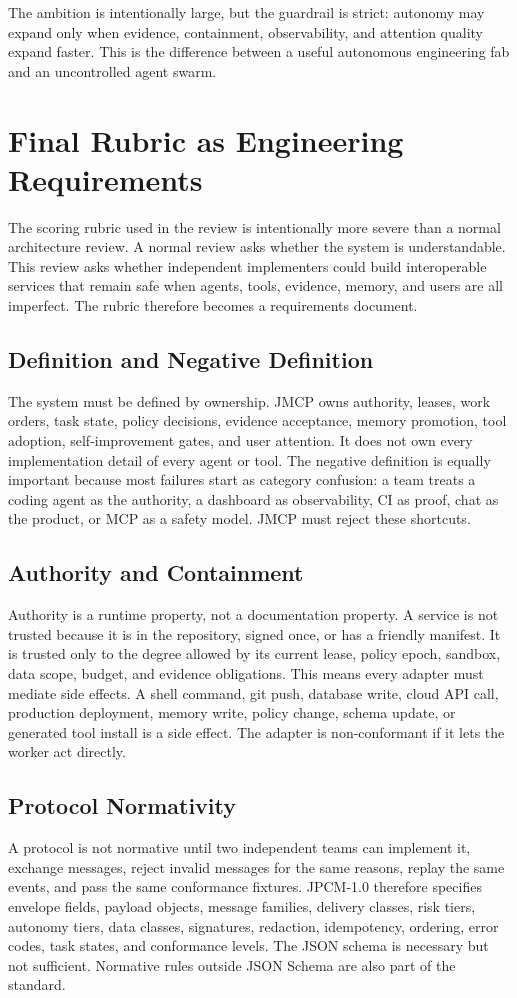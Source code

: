 \documentclass[journal,onecolumn]{IEEEtran}
\begin{document}
The ambition is intentionally large, but the guardrail is strict: autonomy may expand only when evidence, containment, observability, and attention quality expand faster. This is the difference between a useful autonomous engineering fab and an uncontrolled agent swarm.


\section{Final Rubric as Engineering Requirements}
The scoring rubric used in the review is intentionally more severe than a normal architecture review. A normal review asks whether the system is understandable. This review asks whether independent implementers could build interoperable services that remain safe when agents, tools, evidence, memory, and users are all imperfect. The rubric therefore becomes a requirements document.

\subsection{Definition and Negative Definition}
The system must be defined by ownership. JMCP owns authority, leases, work orders, task state, policy decisions, evidence acceptance, memory promotion, tool adoption, self-improvement gates, and user attention. It does not own every implementation detail of every agent or tool. The negative definition is equally important because most failures start as category confusion: a team treats a coding agent as the authority, a dashboard as observability, CI as proof, chat as the product, or MCP as a safety model. JMCP must reject these shortcuts.

\subsection{Authority and Containment}
Authority is a runtime property, not a documentation property. A service is not trusted because it is in the repository, signed once, or has a friendly manifest. It is trusted only to the degree allowed by its current lease, policy epoch, sandbox, data scope, budget, and evidence obligations. This means every adapter must mediate side effects. A shell command, git push, database write, cloud API call, production deployment, memory write, policy change, schema update, or generated tool install is a side effect. The adapter is non-conformant if it lets the worker act directly.

\subsection{Protocol Normativity}
A protocol is not normative until two independent teams can implement it, exchange messages, reject invalid messages for the same reasons, replay the same events, and pass the same conformance fixtures. JPCM-1.0 therefore specifies envelope fields, payload objects, message families, delivery classes, risk tiers, autonomy tiers, data classes, signatures, redaction, idempotency, ordering, error codes, task states, and conformance levels. The JSON schema is necessary but not sufficient. Normative rules outside JSON Schema are also part of the standard.
\end{document}
